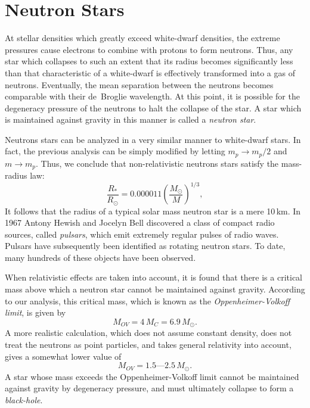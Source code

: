 \section{Neutron Stars}
At stellar densities which greatly exceed white-dwarf densities, the
extreme pressures cause electrons to combine with 
protons to form neutrons. Thus, any star which collapses to such an extent that 
its
radius becomes significantly less than that characteristic
of a  white-dwarf
is  effectively  transformed into  a gas  of
neutrons. Eventually, the mean separation between the neutrons becomes
comparable with their de~Broglie wavelength. At this point, it is possible
for the degeneracy pressure of the neutrons to halt the collapse of the star.
A star which is maintained against gravity in this manner is called
a {\em neutron star}. 

Neutrons stars can be analyzed in a very similar manner to
white-dwarf stars. In fact, the previous analysis can be simply modified
by letting $m_p\rightarrow m_p/2$ and $m\rightarrow m_p$. 
Thus, 
we conclude that
 non-relativistic neutrons stars satisfy the mass-radius law:
\begin{equation}
\frac{R_\ast}{R_\odot}= 0.000011\left(\frac{M_\odot}{M}\right)^{1/3},
\end{equation}
It follows that the radius of a typical solar mass neutron star is
a mere 10\,km. In 1967 Antony Hewish and 
Jocelyn Bell discovered a class of compact radio sources, called {\em pulsars},
 which emit
extremely regular pulses of radio waves. Pulsars have subsequently
been identified as
rotating neutron stars. To date, many hundreds of these objects have been
observed.

When relativistic effects are taken into account, 
it is found that there is
a critical mass above which a neutron star cannot be maintained against
gravity. 
According to our analysis,
this critical mass, which is known as the {\em Oppenheimer-Volkoff
limit}, is given by
\begin{equation}
M_{OV} = 4\,M_C = 6.9\,M_\odot.
\end{equation}
A more realistic calculation, which 
does not assume constant density, does not
treat the neutrons as point particles, and takes general relativity into account,
gives a somewhat lower value of
\begin{equation}
M_{OV} = \mbox{1.5---2.5}\,M_\odot.
\end{equation}
A star whose mass exceeds the Oppenheimer-Volkoff
limit cannot be maintained against gravity by degeneracy pressure, and
must ultimately collapse to form a {\em black-hole}.
